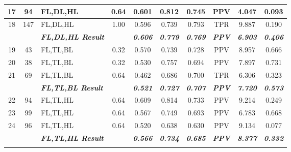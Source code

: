 \begin{table}[H]
{\begin{tabular}{cc|l|c|c|c|c|c|c|c|}
  \multicolumn{1}{|c|}{17} &
    94 &
    FL,DL,HL &
    0.64 &
    0.601 &
    0.812 &
    0.745 &
    PPV &
    4.047 &
    0.093 \\ \hline
  \multicolumn{1}{|c|}{18} &
    147 &
    FL,DL,HL &
    1.00 &
    0.596 &
    0.739 &
    0.793 &
    TPR &
    9.887 &
    0.190 \\ \hline
   &
     &
    \textit{\textbf{FL,DL,HL Result}} &
     &
    \textit{\textbf{0.606}} &
    \textit{\textbf{0.779}} &
    \textit{\textbf{0.769}} &
    \textit{\textbf{PPV}} &
    \textit{\textbf{6.903}} &
    \textit{\textbf{0.406}} \\ \hline
  \multicolumn{1}{|c|}{19} &
    43 &
    FL,TL,BL &
    0.32 &
    0.570 &
    0.739 &
    0.728 &
    PPV &
    8.957 &
    0.666 \\ \hline
  \multicolumn{1}{|c|}{20} &
    38 &
    FL,TL,BL &
    0.32 &
    0.530 &
    0.757 &
    0.694 &
    PPV &
    7.897 &
    0.731 \\ \hline
  \multicolumn{1}{|c|}{21} &
    69 &
    FL,TL,BL &
    0.64 &
    0.462 &
    0.686 &
    0.700 &
    TPR &
    6.306 &
    0.323 \\ \hline
   &
     &
    \textit{\textbf{FL,TL,BL Result}} &
     &
    \textit{\textbf{0.521}} &
    \textit{\textbf{0.727}} &
    \textit{\textbf{0.707}} &
    \textit{\textbf{PPV}} &
    \textit{\textbf{7.720}} &
    \textit{\textbf{0.573}} \\ \hline
  \multicolumn{1}{|c|}{22} &
    94 &
    FL,TL,HL &
    0.64 &
    0.609 &
    0.814 &
    0.733 &
    PPV &
    9.214 &
    0.249 \\ \hline
  \multicolumn{1}{|c|}{23} &
    99 &
    FL,TL,HL &
    0.64 &
    0.567 &
    0.749 &
    0.693 &
    PPV &
    6.783 &
    0.668 \\ \hline
  \multicolumn{1}{|c|}{24} &
    96 &
    FL,TL,HL &
    0.64 &
    0.520 &
    0.638 &
    0.630 &
    PPV &
    9.134 &
    0.077 \\ \hline
   &
     &
    \textit{\textbf{FL,TL,HL Result}} &
     &
    \textit{\textbf{0.566}} &
    \textit{\textbf{0.734}} &
    \textit{\textbf{0.685}} &
    \textit{\textbf{PPV}} &
    \textit{\textbf{8.377}} &
    \textit{\textbf{0.332}} \\ \cline{3-3} \cline{5-10} 
   &
     &
    \cellcolor[HTML]{000000}{\color[HTML]{FFFFFF} \textit{\textbf{Grand Average}}} &
     &
    \cellcolor[HTML]{000000}{\color[HTML]{FFFFFF} \textit{\textbf{0.557}}} &
    \cellcolor[HTML]{000000}{\color[HTML]{FFFFFF} \textit{\textbf{0.737}}} &
    \cellcolor[HTML]{000000}{\color[HTML]{FFFFFF} \textit{\textbf{0.729}}} &

\end{tabular}}
\end{table}
